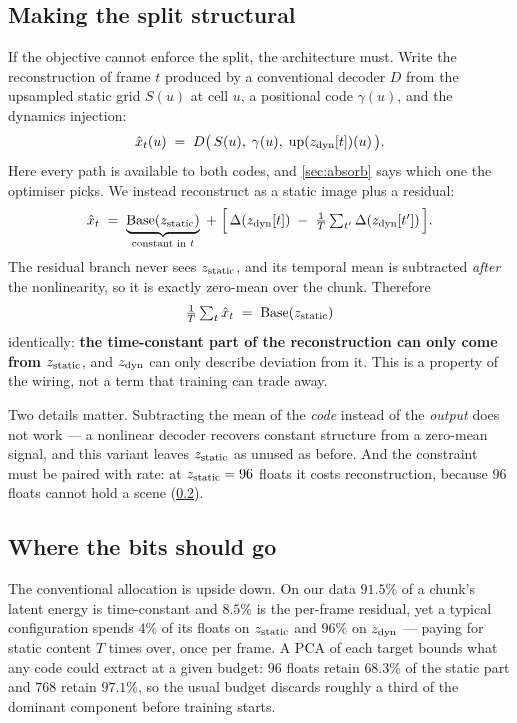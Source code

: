 \subsection{Making the split structural}
\label{sec:basedelta}
If the objective cannot enforce the split, the architecture must. Write the
reconstruction of frame $t$ produced by a conventional decoder $D$ from the upsampled
static grid $S(u)$ at cell $u$, a positional code $\gamma(u)$, and the dynamics
injection:
\begin{equation}
  \hat{x}_t(u) \;=\; D\big(\,S(u),\; \gamma(u),\; \mathrm{up}(z_{\mathrm{dyn}}[t])(u)\,\big).
  \label{eq:free}
\end{equation}
Here every path is available to both codes, and \cref{sec:absorb} says which one the
optimiser picks. We instead reconstruct as a static image plus a residual:
\begin{equation}
  \hat{x}_t \;=\; \underbrace{\mathrm{Base}(z_{\mathrm{static}})}_{\text{constant in } t}
  \;+\; \Big[\, \Delta(z_{\mathrm{dyn}}[t]) \;-\; \tfrac{1}{T}\textstyle\sum_{t'} \Delta(z_{\mathrm{dyn}}[t']) \,\Big].
  \label{eq:basedelta}
\end{equation}
The residual branch never sees $z_{\mathrm{static}}$, and its temporal mean is subtracted \emph{after}
the nonlinearity, so it is exactly zero-mean over the chunk. Therefore
\begin{equation}
  \tfrac{1}{T}\textstyle\sum_t \hat{x}_t \;=\; \mathrm{Base}(z_{\mathrm{static}})
  \label{eq:identity}
\end{equation}
identically: \textbf{the time-constant part of the reconstruction can only come from
$z_{\mathrm{static}}$}, and $z_{\mathrm{dyn}}$ can only describe deviation from it. This is a property of the wiring,
not a term that training can trade away.

Two details matter. Subtracting the mean of the \emph{code} instead of the
\emph{output} does not work --- a nonlinear decoder recovers constant structure from a
zero-mean signal, and this variant leaves $z_{\mathrm{static}}$ as unused as before. And the constraint
must be paired with rate: at $z_{\mathrm{static}}=96$ floats it costs reconstruction, because $96$
floats cannot hold a scene (\cref{sec:rate}).

\subsection{Where the bits should go}
\label{sec:rate}
The conventional allocation is upside down. On our data $91.5\%$ of a chunk's latent
energy is time-constant and $8.5\%$ is the per-frame residual, yet a typical
configuration spends $4\%$ of its floats on $z_{\mathrm{static}}$ and $96\%$ on $z_{\mathrm{dyn}}$ --- paying for
static content $T$ times over, once per frame. A PCA of each target bounds what any code
could extract at a given budget: $96$ floats retain $68.3\%$ of the static part and
$768$ retain $97.1\%$, so the usual budget discards roughly a third of the dominant
component before training starts.

